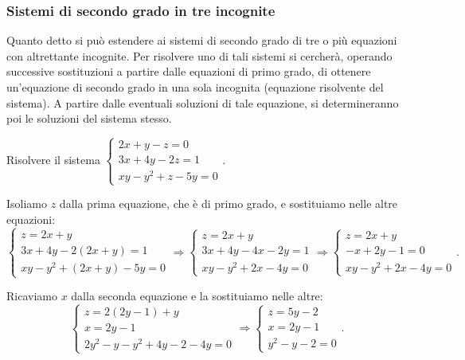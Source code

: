 \subsubsection{Sistemi di secondo grado in tre incognite}

Quanto detto si può estendere ai sistemi di secondo grado di tre o più equazioni con altrettante incognite. Per risolvere uno di tali sistemi si cercherà, operando successive sostituzioni a partire dalle equazioni di primo grado, di ottenere un'equazione di secondo grado in una sola incognita (equazione risolvente del sistema).
A partire dalle eventuali soluzioni di tale equazione, si determineranno poi le soluzioni del sistema stesso.
\begin{exrig}
\begin{esempio}
Risolvere il sistema $\left\{\begin{array}{l}2x+y-z=0\\3x+4y-2z=1\\xy-y^2+z-5y=0\end{array}\right.$.

Isoliamo $z$ dalla prima equazione, che è di primo grado, e sostituiamo nelle altre equazioni:
\[ \left\{\begin{array}{l}z=2x+y\\
3x+4y-2(2x+y)=1\\
{xy}-y^2+(2x+y)-5y=0\end{array}\right. \Rightarrow\left\{\begin{array}{l}z=2x+y\\
3x+4y-4x-2y=1\\
xy-y^2+2x-4y=0\end{array}\right. \Rightarrow\left\{\begin{array}{l}z=2x+y\\
-x+2y-1=0\\
xy-y^2+2x-4y=0\end{array}\right..\]

Ricaviamo $x$ dalla seconda equazione e la sostituiamo nelle altre:
\[ \left\{\begin{array}{l}z=2(2y-1)+y\\
x=2y-1\\
2y^2-y-y^2+4y-2-4y=0\end{array}\right. \Rightarrow\left\{\begin{array}{l}z=5y-2\\
x=2y-1\\
y^2-y-2=0\end{array}\right..\]


\end{esempio}
\end{exrig}
